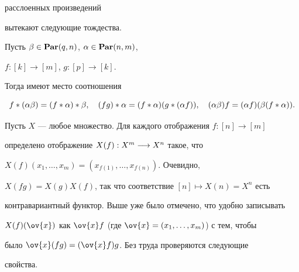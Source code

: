 расслоенных произведений


вытекают следующие тождества.





\begin{lem}


Пусть $\beta\in \bold{Par}(q,n)$, $\alpha\in \bold{Par}(n,m)$,


$f: [k]\to [m]$, $g:[p]\to [k]$.


Тогда имеют место соотношения


$$


f*(\al\be)= (f*\al)*\be, \quad


(fg)*\al= (f*\al)(g*(\al f)), \quad


(\al\be) f= (\al f)(\be(f*\al)).


$$


\end{lem}





Пусть $X$ --- любое множество. Для каждого отображения $f:[n]\to [m]$


определено отображение $X(f):X^m\overset{}{\longrightarrow}{} X^n$ такое, что


$X(f)(x_1,\dotsc, x_m)=(x_{f(1)},\dotsc,x_{f(n)})$. Очевидно,


$X(fg)=X(g)X(f)$, так что соответствие $[n]\mapsto X(n)=X^n$ есть


контравариантный функтор. Выше уже было отмечено, что удобно записывать


$X(f)(\ov{x})$ как $\ov{x}f$ (где $\ov{x}=(x_1,\dotsc, x_m)$) с тем, чтобы


было $\ov{x}(fg)=(\ov{x}f)g$. Без труда проверяются следующие


свойства.





